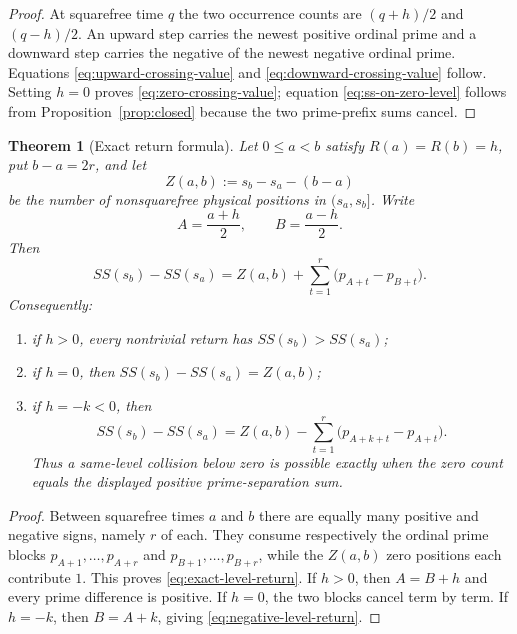 \documentclass[11pt]{amsart}
\numberwithin{equation}{section}
\theoremstyle{plain}
\newtheorem{theorem}{Theorem}[section]
\theoremstyle{definition}
\theoremstyle{remark}
\begin{document}
\begin{proof}
At squarefree time $q$ the two occurrence counts are
$(q+h)/2$ and $(q-h)/2$.  An upward step carries the newest positive ordinal
prime and a downward step carries the negative of the newest negative ordinal
prime.  Equations \eqref{eq:upward-crossing-value} and
\eqref{eq:downward-crossing-value} follow.  Setting $h=0$ proves
\eqref{eq:zero-crossing-value}; equation \eqref{eq:ss-on-zero-level} follows
from Proposition~\ref{prop:closed} because the two prime-prefix sums cancel.
\end{proof}

\begin{theorem}[Exact return formula]
\label{thm:level-return}
Let $0\le a<b$ satisfy $R(a)=R(b)=h$, put $b-a=2r$, and let
\begin{equation}
\label{eq:return-zero-count}
Z(a,b):=s_b-s_a-(b-a)
\end{equation}
be the number of nonsquarefree physical positions in $(s_a,s_b]$.  Write
\begin{equation}
\label{eq:return-start-counts}
A=\frac{a+h}{2},\qquad B=\frac{a-h}{2}.
\end{equation}
Then
\begin{equation}
\label{eq:exact-level-return}
\boxed{
SS(s_b)-SS(s_a)
=Z(a,b)+\sum_{t=1}^{r}\bigl(p_{A+t}-p_{B+t}\bigr).}
\end{equation}
Consequently:
\begin{enumerate}[label=(\roman*)]
\item if $h>0$, every nontrivial return has $SS(s_b)>SS(s_a)$;
\item if $h=0$, then $SS(s_b)-SS(s_a)=Z(a,b)$;
\item if $h=-k<0$, then
\begin{equation}
\label{eq:negative-level-return}
SS(s_b)-SS(s_a)
=Z(a,b)-\sum_{t=1}^{r}\bigl(p_{A+k+t}-p_{A+t}\bigr).
\end{equation}
Thus a same-level collision below zero is possible exactly when the zero count
equals the displayed positive prime-separation sum.
\end{enumerate}
\end{theorem}

\begin{proof}
Between squarefree times $a$ and $b$ there are equally many positive and
negative signs, namely $r$ of each.  They consume respectively the ordinal
prime blocks $p_{A+1},\ldots,p_{A+r}$ and
$p_{B+1},\ldots,p_{B+r}$, while the $Z(a,b)$ zero positions each contribute
$1$.  This proves \eqref{eq:exact-level-return}.  If $h>0$, then $A=B+h$ and
every prime difference is positive.  If $h=0$, the two blocks cancel term by
term.  If $h=-k$, then $B=A+k$, giving
\eqref{eq:negative-level-return}.
\end{proof}
\end{document}
